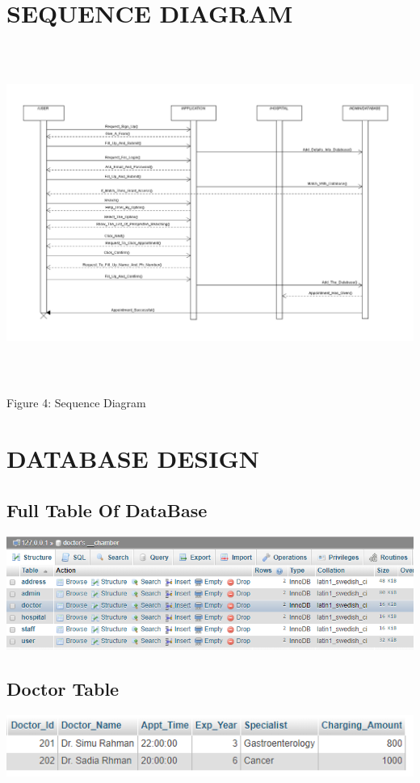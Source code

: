 \documentclass[12pt]{article}
\begin{document}
\section{SEQUENCE DIAGRAM}
\includegraphics[height=11cm]{SequenceDiagram.PNG}
\begin{center}
 \caption{ Figure 4: Sequence Diagram}
    
\end{center}
\pagebreak
\section{DATABASE DESIGN}

\subsection{Full Table Of DataBase}

\includegraphics[scale = 0.68]{ALL.PNG}
\subsection{Doctor Table}

\includegraphics[scale = 0.99]{Tdoctor.PNG}
\end{document}
